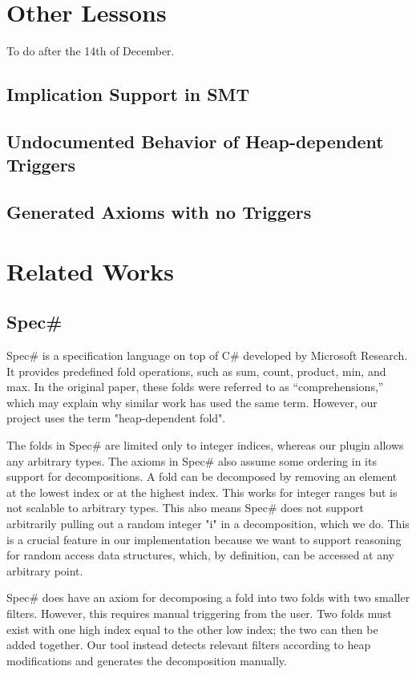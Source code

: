 \documentclass[msc,oneside]{ubcthesis}
\begin{document}
\chapter{Other Lessons}
To do after the 14th of December. 

\section{Implication Support in SMT}

\section{Undocumented Behavior of Heap-dependent Triggers}

\section{Generated Axioms with no Triggers}

\chapter{Related Works}
	

\section{Spec\#}
Spec\# is a specification language on top of C\# developed by Microsoft Research. It provides predefined fold operations, such as sum, count, product, min, and max. In the original paper, these folds were referred to as ``comprehensions,'' which may explain why similar work has used the same term. However, our project uses the term "heap-dependent fold".

The folds in Spec\# are limited only to integer indices, whereas our plugin allows any arbitrary types. The axioms in Spec\# also assume some ordering in its support for decompositions. A fold can be decomposed by removing an element at the lowest index or at the highest index. This works for integer ranges but is not scalable to arbitrary types. This also means Spec\# does not support arbitrarily pulling out a random integer "i" in a decomposition, which we do. This is a crucial feature in our implementation because we want to support reasoning for random access data structures, which, by definition, can be accessed at any arbitrary point.

Spec\# does have an axiom for decomposing a fold into two folds with two smaller filters. However, this requires manual triggering from the user. Two folds must exist with one high index equal to the other low index; the two can then be added together. Our tool instead detects relevant filters according to heap modifications and generates the decomposition manually.    
\end{document}
